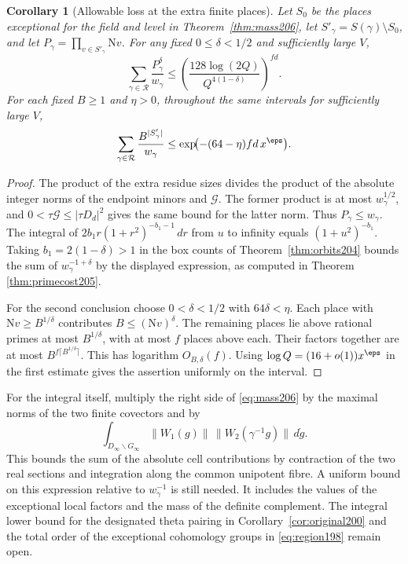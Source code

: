 \documentclass[a4paper,11pt]{article}
\newtheorem{corollary}[proposition]{Corollary}
\theoremstyle{definition}
\theoremstyle{remark}
\numberwithin{equation}{section}
\begin{document}
\begin{corollary}[Allowable loss at the extra finite places]
\label{cor:primecost206}
Let \(S_0\) be the places exceptional for the field and level in
Theorem~\ref{thm:mass206}, let \(S'_\gamma=S(\gamma)\setminus S_0\),
and let \(P_\gamma=\prod_{v\in S'_\gamma}\mathrm Nv\).
For any fixed \(0\le\delta<1/2\) and sufficiently large \(V\),
\[
  \sum_{\gamma\in\mathcal R}\frac{P_\gamma^\delta}{w_\gamma}
     \le\left(\frac{128\log(2Q)}{Q^{4(1-\delta)}}\right)^{fd}.
\]
For each fixed \(B\ge1\) and \(\eta>0\), throughout the same
intervals for sufficiently large \(V\),
\[
  \sum_{\gamma\in\mathcal R}\frac{B^{|S'_\gamma|}}{w_\gamma}
            \le \exp\!\bigl(-(64-\eta)fd\,x^\eps\bigr).
\]
\end{corollary}
\begin{proof}
The product of the extra residue sizes divides the product of the
absolute integer norms of the endpoint minors and \(\mathcal G\).
The former product is at most \(w_\gamma^{1/2}\), and
\(0<\tau\mathcal G\le|\tau D_d|^2\) gives the same bound for
the latter norm. Thus \(P_\gamma\le w_\gamma\). The integral of
\(2b_1r(1+r^2)^{-b_1-1}\,dr\) from \(u\) to infinity equals
\((1+u^2)^{-b_1}\). Taking \(b_1=2(1-\delta)>1\) in the box
counts of Theorem~\ref{thm:orbits204} bounds the sum of
\(w_\gamma^{-1+\delta}\) by the displayed expression, as computed in
Theorem \ref{thm:primecost205}.

For the second conclusion choose \(0<\delta<1/2\) with
\(64\delta<\eta\). Each place with \(\mathrm Nv\ge B^{1/\delta}\)
contributes \(B\le(\mathrm Nv)^\delta\). The remaining places lie
above rational primes at most \(B^{1/\delta}\), with at most \(f\)
places above each. Their factors together are at most
\(B^{f\lceil B^{1/\delta}\rceil}\). This has logarithm \(O_{B,\delta}(f)\).
Using \(\log Q=(16+o(1))x^\eps\) in the first estimate gives the
assertion uniformly on the interval.
\end{proof}

For the integral itself, multiply the right side of \eqref{eq:mass206}
by the maximal norms of the two finite covectors and by
\[
   \int_{D_\infty\backslash G_\infty}
       \|W_1(g)\|\,\|W_2(\gamma^{-1}g)\|\,d\dot g .
\]
This bounds the sum of the absolute cell contributions by contraction
of the two real sections and integration along the common unipotent
fibre. A uniform bound on this expression relative to
\(w_\gamma^{-1}\) is still needed. It includes the values of the
exceptional local factors and the mass of the definite complement.
The integral lower bound for the designated theta pairing in
Corollary~\ref{cor:original200} and the total order of the
exceptional cohomology groups in \eqref{eq:region198} remain open.
\end{document}
